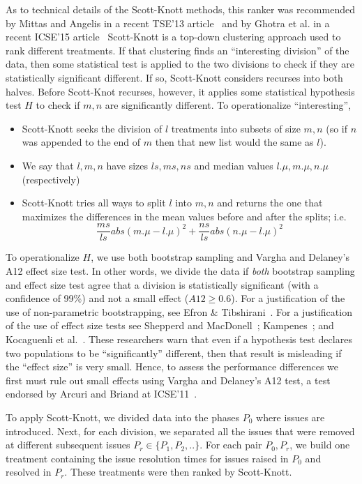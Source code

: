 \documentclass[smallcondensed]{svjour3}
\newcommand{\bi}{\begin{itemize}}%
\newcommand{\ei}{\end{itemize}}
\begin{document}
    As to technical details of the Scott-Knott methods, this ranker 
      was   recommended  by  Mittas and Angelis in a
    recent TSE'13 article~\cite{mittas13} and by Ghotra et al. in a recent
    ICSE'15 article~\cite{ghotra2015icse}
    Scott-Knott is a 
    top-down clustering approach used to rank different treatments. If that 
    clustering finds an ``interesting division'' of the data, then some 
    statistical test is applied to the two divisions to check if they are 
    statistically significant different. If so, Scott-Knott considers recurses into both 
    halves.
    Before Scott-Knot recurses,  however,  it applies some  statistical hypothesis test $H$ to check
    if $m,n$ are significantly different. 
    To operationalize ``interesting'', 
    \bi
    \item
    Scott-Knott seeks the division of 
    $l$ treatments into subsets of size $m,n$ (so if $n$ was 
    appended to the  end of $m$ then that new list
    would the same as $l$).
    \item
    We say that $l,m,n$ have
    sizes $ls,ms,ns$ and median values
    $l.\mu, m.\mu, n.\mu$ (respectively) 
    \item
    Scott-Knott tries all ways to split $l$ into $m,n$ and returns
    the one that maximizes the differences in the mean values
    before and after the splits; i.e. 
 \[\frac{ms}{ls}abs(m.\mu - l.\mu)^2 + \frac{ns}{ls}abs(n.\mu - l.\mu)^2\]
   \ei
   To operationalize $H$, we use both  bootstrap sampling  and Vargha and Delaney's A12 effect size test.
   In other 
    words, we divide the data if \textit{both} bootstrap sampling and effect 
    size test agree that a division is statistically significant (with a 
    confidence of 99\%) and not a small effect ($A12 \ge 0.6$).
    For a justification of the use of non-parametric bootstrapping, see Efron 
    \& Tibshirani~\cite[p220-223]{efron93}. For a justification of the use of 
    effect size tests see Shepperd and MacDonell~\cite{shepperd12a}; 
    Kampenes~\cite{kampenes07}; and Kocaguenli et 
    al.~\cite{Kocaguneli2013:ep}. These researchers warn that even if a 
    hypothesis test declares two populations to be ``significantly'' 
    different, then that result is misleading if the ``effect size'' is very 
    small. Hence, to assess the performance differences we first must rule out 
    small effects using Vargha and Delaney's A12 test, a test    endorsed by Arcuri and 
    Briand at ICSE'11~\cite{arcuri11}.
  
    
    To  apply Scott-Knott, we divided data into the phases $P_0$ where issues are introduced. Next, for each division, we separated all the issues that were removed at different subsequent issues $P_r \in \{P_1,P_2,..\}$.
    For each pair $P_0,P_r$, we build one treatment containing the  issue resolution times for     issues raised in $P_0$ and resolved in $P_r$. These treatments
    were then ranked by Scott-Knott. 
     
\end{document}
